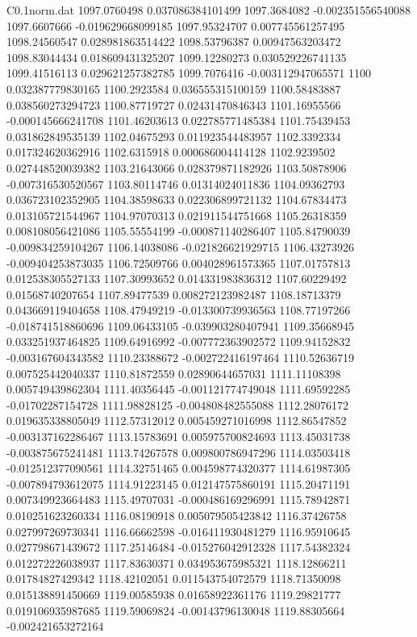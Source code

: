 \begin{filecontents}{C0.1norm.dat}
1097.0760498		0.037086384101499
1097.3684082		-0.002351556540088
1097.6607666		-0.019629668099185
1097.95324707		0.007745561257495
1098.24560547		0.028981863514422
1098.53796387		0.00947563203472
1098.83044434		0.018609431325207
1099.12280273		0.030529226741135
1099.41516113		0.029621257382785
1099.7076416		-0.003112947065571
1100		0.032387779830165
1100.2923584		0.036555315100159
1100.58483887		0.038560273294723
1100.87719727		0.02431470846343
1101.16955566		-0.000145666241708
1101.46203613		0.022785771485384
1101.75439453		0.031862849535139
1102.04675293		0.011923544483957
1102.3392334		0.017324620362916
1102.6315918		0.000686004414128
1102.9239502		0.027448520039382
1103.21643066		0.028379871182926
1103.50878906		-0.007316530520567
1103.80114746		0.01314024011836
1104.09362793		0.036723102352905
1104.38598633		0.022306899721132
1104.67834473		0.013105721544967
1104.97070313		0.021911544751668
1105.26318359		0.008108056421086
1105.55554199		-0.000871140286407
1105.84790039		-0.009834259104267
1106.14038086		-0.021826621929715
1106.43273926		-0.009404253873035
1106.72509766		0.004028961573365
1107.01757813		0.012538305527133
1107.30993652		0.014331983836312
1107.60229492		0.01568740207654
1107.89477539		0.008272123982487
1108.18713379		0.043669119404658
1108.47949219		-0.013300739936563
1108.77197266		-0.018741518860696
1109.06433105		-0.039903280407941
1109.35668945		0.033251937464825
1109.64916992		-0.007772363902572
1109.94152832		-0.003167604343582
1110.23388672		-0.002722416197464
1110.52636719		0.007525442040337
1110.81872559		0.02890644657031
1111.11108398		0.005749439862304
1111.40356445		-0.001121774749048
1111.69592285		-0.01702287154728
1111.98828125		-0.004808482555088
1112.28076172		0.019635338805049
1112.57312012		0.005459271016998
1112.86547852		-0.003137162286467
1113.15783691		0.005975700824693
1113.45031738		-0.003875675241481
1113.74267578		0.009800786947296
1114.03503418		-0.012512377090561
1114.32751465		0.004598774320377
1114.61987305		-0.007894793612075
1114.91223145		0.012147575860191
1115.20471191		0.007349923664483
1115.49707031		-0.000486169296991
1115.78942871		0.010251623260334
1116.08190918		0.005079505423842
1116.37426758		0.027997269730341
1116.66662598		-0.016411930481279
1116.95910645		0.027798671439672
1117.25146484		-0.015276042912328
1117.54382324		0.012272226038937
1117.83630371		0.034953675985321
1118.12866211		0.01784827429342
1118.42102051		0.011543754072579
1118.71350098		0.015138891450669
1119.00585938		0.01658922361176
1119.29821777		0.019106935987685
1119.59069824		-0.00143796130048
1119.88305664		-0.002421653272164

\end{filecontents}
